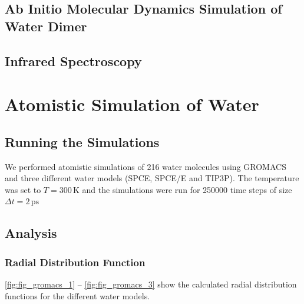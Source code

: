 \documentclass[a4paper,10pt,bibtotoc]{scrartcl}
\begin{document}
\subsection{Ab Initio Molecular Dynamics Simulation of Water Dimer}
\subsection{Infrared Spectroscopy}

\section{Atomistic Simulation of Water}
\subsection{Running the Simulations}
We performed atomistic simulations of 216 water molecules using GROMACS and three different water models (SPCE, SPCE/E and TIP3P). The temperature was set to $T=300\,\mathrm{K}$ and the simulations were run for 250000 time steps of size $\Delta t = 2\,\mathrm{ps}$

\subsection{Analysis}
\subsubsection*{Radial Distribution Function}
\autoref{fig:fig_gromacs_1} -- \autoref{fig:fig_gromacs_3} show the calculated radial distribution functions for the different water models.
\end{document}
